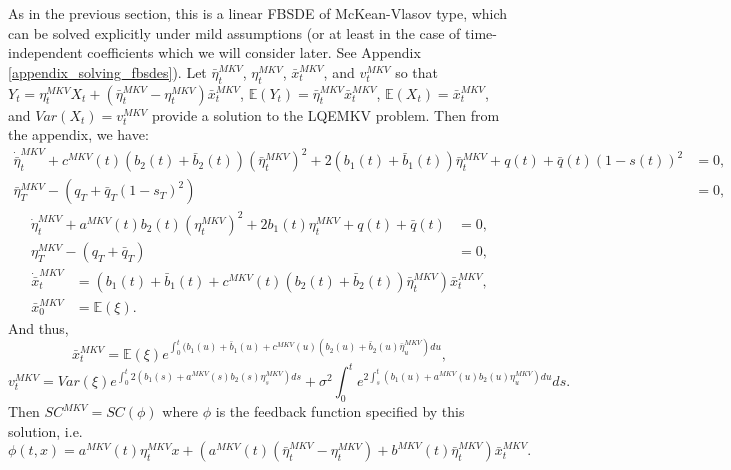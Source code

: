 \documentclass[11pt]{article}
\begin{document}
As in the previous section, this is a linear FBSDE of McKean-Vlasov type, which can be solved explicitly under mild assumptions (or at least in the case of time-independent coefficients which we will consider later. See Appendix \ref{appendix_solving_fbsdes}). Let $\bar{\eta}_t^{MKV}$, $\eta_t^{MKV}$, $\bar{x}_t^{MKV}$, and $v^{MKV}_t$ so that $Y_t=\eta_t^{MKV}X_t+(\bar{\eta}_t^{MKV}-\eta_t^{MKV})\bar{x}_t^{MKV}$, $\mathbb{E}(Y_t)=\bar{\eta}_t^{MKV}\bar{x}_t^{MKV}$, $\mathbb{E}(X_t)=\bar{x}_t^{MKV}$, and $Var(X_t)=v^{MKV}_t$ provide a solution to the LQEMKV problem. Then from the appendix, we have:
\begin{equation}
\begin{split}
\dot{\bar{\eta}}^{MKV}_t+c^{MKV}(t)(b_2(t)+\bar{b}_2(t)) (\bar{\eta}^{MKV}_t)^2+2(b_1(t)+\bar{b}_1(t)) \bar{\eta}^{MKV}_t +q(t)+\bar{q}(t)(1-s(t))^2&=0,\\
\bar{\eta}^{MKV}_T-(q_T+\bar{q}_T(1-s_T)^2)&=0,
\end{split}
\label{eq:eta_bar_MKV}
\end{equation}
\begin{equation}
\begin{split}
\dot{\eta}^{MKV}_t+a^{MKV}(t)b_2(t)(\eta^{MKV}_t)^2+2b_1(t)\eta^{MKV}_t+q(t)+\bar{q}(t)&=0, \\
\eta^{MKV}_T-(q_T+\bar{q}_T)&=0,
\end{split}
\end{equation}
\begin{equation}
\begin{split}
\dot{\bar{x}}^{MKV}_t&=(b_1(t)+\bar{b}_1(t)+c^{MKV}(t)(b_2(t)+\bar{b}_2(t))\bar{\eta}^{MKV}_t)\bar{x}^{MKV}_t, \\
\bar{x}^{MKV}_0&=\mathbb{E}(\xi).
\end{split}
\label{eq:x_bar_MKV}
\end{equation}
And thus,
\begin{equation}
\bar{x}^{MKV}_t=\mathbb{E}(\xi) e^{\int_0^t(b_1(u)+\bar{b}_1(u)+c^{MKV}(u)(b_2(u)+\bar{b}_2(u)\bar{\eta}^{MKV}_u)du},
\label{eq:x_bar_MKV}
\end{equation}
\begin{equation}
v^{MKV}_t=Var(\xi)e^{\int_0^t 2(b_1(s)+a^{MKV}(s)b_2(s)\eta^{MKV}_s)ds}+\sigma^2 \int_0^t e^{2 \int_s^t (b_1(u)+a^{MKV}(u)b_2(u)\eta^{MKV}_u) du}ds.
\label{eq:v_t_MKV}
\end{equation}
Then $SC^{MKV}=SC(\phi)$ where $\phi$ is the feedback function specified by this solution, i.e.
\begin{equation*}
    \phi(t,x)=a^{MKV}(t)\eta_t^{MKV}x+\left(a^{MKV}(t)(\bar{\eta}_t^{MKV}-\eta_t^{MKV})+b^{MKV}(t)\bar{\eta}_t^{MKV} \right)\bar{x}_t^{MKV}.
\end{equation*}
\end{document}
